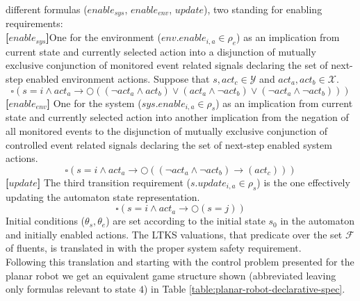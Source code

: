 different formulas ($enable_{sys}$, $enable_{env}$, $update$), two standing for enabling requirements:\\
\textbf{[$enable_{sys}$]}One for the environment ($env.enable_{i,a} \in \rho_e$) as an implication from current state 
and currently selected action into a disjunction of mutually exclusive conjunction 
of monitored event related signals declaring the set of next-step enabled
environment actions. Suppose that $s, act_c \in \mathcal{Y}$
and $act_a, act_b \in \mathcal{X}$.
\[
\square(s = i \wedge act_a \rightarrow \Circle((\neg act_a \wedge act_b)\vee(act_a \wedge \neg act_b) \vee (\neg act_a \wedge \neg act_b)))\]
\textbf{[$enable_{env}$]} One for the system ($sys.enable_{i,a} \in \rho_s$) as an implication from current state
and currently selected action into another implication 
from the negation of all monitored events to the
disjunction of mutually exclusive conjunction of controlled
event related signals declaring the set of next-step enabled
system actions.
\[
\square(s = i \wedge act_a \rightarrow \Circle((\neg act_a \wedge \neg act_b)\rightarrow (act_c)))\]
\textbf{[$update$]} The third transition requirement ($s.update_{i,a} \in \rho_s$) is the one 
effectively updating the automaton state representation.
\[
\square(s = i \wedge act_a \rightarrow \Circle(s = j))\]
Initial conditions ($\theta_s, \theta_e$) are set according to the initial state 
$s_0$ in the automaton and initially enabled actions.
The LTKS valuations, that predicate over the set $\mathcal{F}$ of 
fluents, is translated in with the proper system safety requirement.\\
Following this translation and starting with
the control problem presented for the planar robot
we get an equivalent game structure shown (abbreviated
leaving only formulas relevant to state $4$) in 
Table \ref{table:planar-robot-declarative-spec}.

